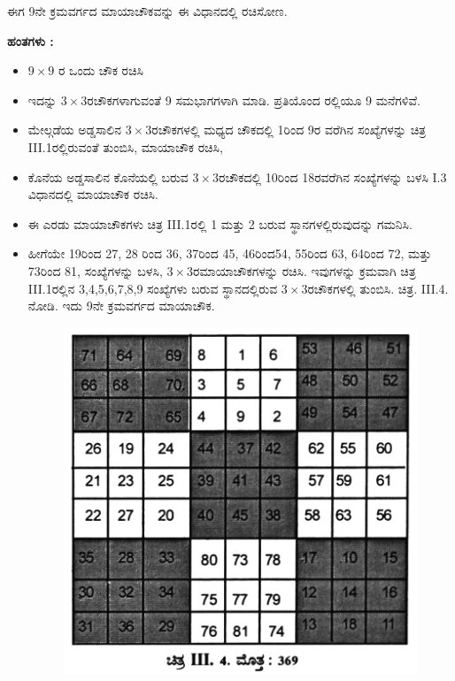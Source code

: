 ಈಗ 9ನೇ ಕ್ರಮವರ್ಗದ ಮಾಯಾಚೌಕವನ್ನು ಈ ವಿಧಾನದಲ್ಲಿ ರಚಿಸೋಣ.

\textbf{ಹಂತಗಳು :}
\begin{itemize}
	\item $9 \times 9$ ರ ಒಂದು ಚೌಕ ರಚಿಸಿ
	\item ಇದನ್ನು $3 \times 3$ರಚೌಕಗಳಾಗುವಂತೆ 9 ಸಮಭಾಗಗಳಾಗಿ ಮಾಡಿ. ಪ್ರತಿಯೊಂದ ರಲ್ಲಿಯೂ 9 ಮನೆಗಳಿವೆ.
	\item ಮೇಲ್ಗಡೆಯ ಅಡ್ಡಸಾಲಿನ $3 \times 3$ರಚೌಕಗಳಲ್ಲಿ ಮಧ್ಯದ ಚೌಕದಲ್ಲಿ 1ರಿಂದ 9ರ ವರೆಗಿನ ಸಂಖ್ಯೆಗಳನ್ನು ಚಿತ್ರ III.1ರಲ್ಲಿರುವಂತೆ ತುಂಬಿಸಿ, ಮಾಯಾಚೌಕ ರಚಿಸಿ,
	\item ಕೊನೆಯ ಅಡ್ಡಸಾಲಿನ ಕೊನೆಯಲ್ಲಿ ಬರುವ $3 \times 3$ರಚೌಕದಲ್ಲಿ 10ರಿಂದ 18ರವರೆಗಿನ ಸಂಖ್ಯೆಗಳನ್ನು ಬಳಸಿ I.3 ವಿಧಾನದಲ್ಲಿ ಮಾಯಾಚೌಕ ರಚಿಸಿ.
	\item ಈ ಎರಡು ಮಾಯಾಚೌಕಗಳು ಚಿತ್ರ III.1ರಲ್ಲಿ 1 ಮತ್ತು 2 ಬರುವ ಸ್ಥಾನಗಳಲ್ಲಿರುವುದನ್ನು ಗಮನಿಸಿ.
	\item ಹೀಗೆಯೇ 19ರಿಂದ 27, 28 ರಿಂದ 36, 37ರಿಂದ 45, 46ರಿಂದ54, 55ರಿಂದ 63, 64ರಿಂದ 72, ಮತ್ತು 73ರಿಂದ 81, ಸಂಖ್ಯೆಗಳನ್ನು ಬಳಸಿ, $3 \times 3$ರಮಾಯಾಚೌಕಗಳನ್ನು 
	ರಚಿಸಿ. ಇವುಗಳನ್ನು ಕ್ರಮವಾಗಿ ಚಿತ್ರ III.1ರಲ್ಲಿನ 3,4,5,6,7,8,9 ಸಂಖ್ಯೆಗಳು ಬರುವ ಸ್ಥಾನದಲ್ಲಿರುವ $3 \times 3$ರಚೌಕಗಳಲ್ಲಿ ತುಂಬಿಸಿ. ಚಿತ್ರ. III.4. ನೋಡಿ. ಇದು 9ನೇ ಕ್ರಮವರ್ಗದ ಮಾಯಾಚೌಕ.
	\begin{figure}[h]
	\includegraphics{src/figures/chap3/fig3.31.jpg}
	\end{figure}
\end{itemize}
